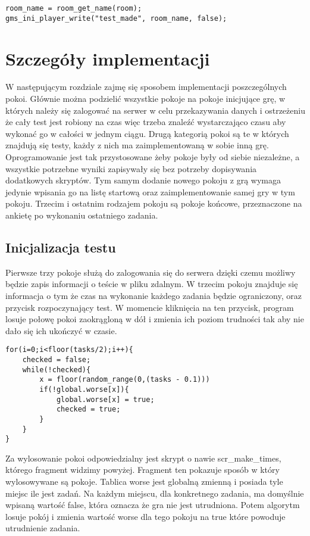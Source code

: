 \documentclass[openright]{xmgr}
\begin{document}
\begin{lstlisting}[caption={Fragment skryptu w przypadku końca czasu}]
room_name = room_get_name(room);
gms_ini_player_write("test_made", room_name, false);
\end{lstlisting}




\chapter{Szczegóły implementacji}
W następującym rozdziale zajmę się sposobem implementacji poszczególnych pokoi. Głównie można podzielić wszystkie pokoje na pokoje inicjujące grę, w których należy się zalogować na serwer w celu przekazywania danych i ostrzeżeniu że cały test jest robiony na czas więc trzeba znaleźć wystarczająco czasu aby wykonać go w całości w jednym ciągu. Drugą kategorią pokoi są te w których znajdują się testy, każdy z nich ma zaimplementowaną w sobie inną grę. Oprogramowanie jest tak przystosowane żeby pokoje były od siebie niezależne, a wszystkie potrzebne wyniki zapisywały się bez potrzeby dopisywania dodatkowych skryptów. Tym samym dodanie nowego pokoju z grą wymaga jedynie wpisania go na listę startową oraz zaimplementowanie samej gry w tym pokoju. Trzecim i ostatnim rodzajem pokoju są pokoje końcowe, przeznaczone na ankietę po wykonaniu ostatniego zadania.

\section{Inicjalizacja testu}
Pierwsze trzy pokoje służą do zalogowania się do serwera dzięki czemu możliwy będzie zapis informacji o teście w pliku zdalnym. W trzecim pokoju znajduje się informacja o tym że czas na wykonanie każdego zadania będzie ograniczony, oraz przycisk rozpoczynający test. W momencie kliknięcia na ten przycisk, program losuje połowę pokoi zaokrągloną w dół i zmienia ich poziom trudności tak aby nie dało się ich ukończyć w czasie.

\begin{lstlisting}[caption={Fragment skryptu scr\_make\_times}]
for(i=0;i<floor(tasks/2);i++){
    checked = false;
    while(!checked){
        x = floor(random_range(0,(tasks - 0.1)))
        if(!global.worse[x]){
            global.worse[x] = true;
            checked = true;
        }
    }
}
\end{lstlisting}

Za wylosowanie pokoi odpowiedzialny jest skrypt o nawie scr\_make\_times, którego fragment widzimy powyżej. Fragment ten pokazuje sposób w który wylosowywane są pokoje. Tablica worse jest globalną zmienną i posiada tyle miejsc ile jest zadań. Na każdym miejscu, dla konkretnego zadania, ma domyślnie wpisaną wartość false, która oznacza że gra nie jest utrudniona. Potem algorytm losuje pokój i zmienia wartość worse dla tego pokoju na true które powoduje utrudnienie zadania.
\end{document}

